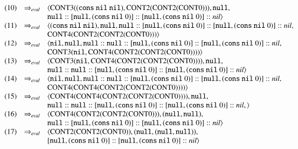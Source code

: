 \documentclass{article}
\begin{document}
\[\begin{array}{crl}
  (10) & \estep & \langle
  \cont{3}((\cons~\nil~\nil), \cont{2}(\cont{2}(\cont{0}))),
  \null,\\
  & \br &
  \null :: [\null, (\cons~\nil~0)] :: [\null, (\cons~\nil~0)] :: \nils
  \rangle \\


  (11) & \estep & \langle
  (\cons~\nil~\nil),
  \null,
  \null :: [\null, (\cons~\nil~0)] :: [\null, (\cons~\nil~0)] :: \nils,\\
  & \br &
  \cont{4}(\cont{2}(\cont{2}(\cont{0})))
  \rangle \\

  (12) & \estep & \langle
  \nil,
  \null,
  \null :: \null :: [\null, (\cons~\nil~0)] :: [\null, (\cons~\nil~0)] :: \nils,\\
  & \br &
  \cont{3}(\nil, \cont{4}(\cont{2}(\cont{2}(\cont{0}))))
  \rangle \\

  (13) & \estep & \langle
  \cont{3}(\nil, \cont{4}(\cont{2}(\cont{2}(\cont{0})))),
  \null,\\
  & \br &
  \null :: \null :: [\null, (\cons~\nil~0)] :: [\null, (\cons~\nil~0)] :: \nils
  \rangle \\

  (14) & \estep & \langle
  \nil,
  \null,
  \null :: \null :: [\null, (\cons~\nil~0)] :: [\null, (\cons~\nil~0)] :: \nils,\\
  & \br &
  \cont{4}(\cont{4}(\cont{2}(\cont{2}(\cont{0}))))
  \rangle \\

  (15) & \estep & \langle
  \cont{4}(\cont{4}(\cont{2}(\cont{2}(\cont{0})))),
  \null,\\
  & \br &
  \null :: \null :: [\null, (\cons~\nil~0)] :: [\null, (\cons~\nil~0)] :: \nils,
  \rangle \\

  (16) & \estep & \langle
  \cont{4}(\cont{2}(\cont{2}(\cont{0}))),
  (\null, \null),\\
  & \br &
  \null :: [\null, (\cons~\nil~0)] :: [\null, (\cons~\nil~0)] :: \nils
  \rangle \\

  (17) & \estep & \langle
  \cont{2}(\cont{2}(\cont{0})),
  (\null, (\null, \null)),\\
  & \br &
  [\null, (\cons~\nil~0)] :: [\null, (\cons~\nil~0)] :: \nils
  \rangle \\


\end{array}\]
\end{document}
